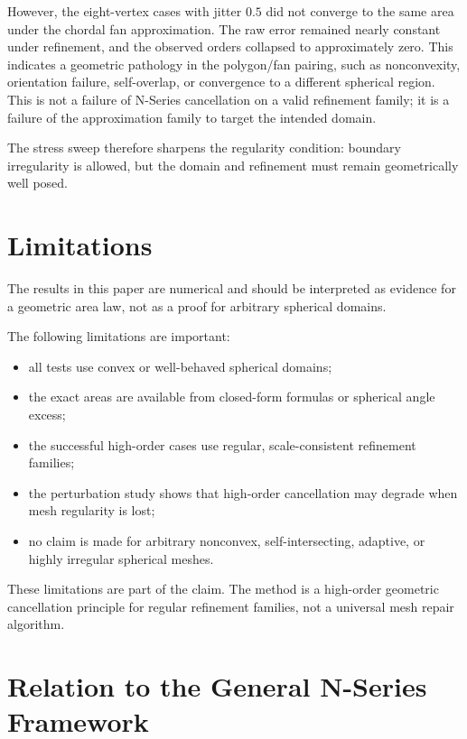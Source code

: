 \documentclass[11pt]{article}
\begin{document}
However, the eight-vertex cases with jitter $0.5$ did not converge to the
same area under the chordal fan approximation.  The raw error remained nearly
constant under refinement, and the observed orders collapsed to approximately
zero.  This indicates a geometric pathology in the polygon/fan pairing, such
as nonconvexity, orientation failure, self-overlap, or convergence to a
different spherical region.  This is not a failure of N-Series cancellation
on a valid refinement family; it is a failure of the approximation family to
target the intended domain.

The stress sweep therefore sharpens the regularity condition: boundary
irregularity is allowed, but the domain and refinement must remain
geometrically well posed.

\section{Limitations}

The results in this paper are numerical and should be interpreted as
evidence for a geometric area law, not as a proof for arbitrary spherical
domains.

The following limitations are important:

\begin{itemize}
\item all tests use convex or well-behaved spherical domains;
\item the exact areas are available from closed-form formulas or spherical
      angle excess;
\item the successful high-order cases use regular, scale-consistent
      refinement families;
\item the perturbation study shows that high-order cancellation may degrade
      when mesh regularity is lost;
\item no claim is made for arbitrary nonconvex, self-intersecting, adaptive,
      or highly irregular spherical meshes.
\end{itemize}

These limitations are part of the claim.  The method is a high-order
geometric cancellation principle for regular refinement families, not a
universal mesh repair algorithm.

\section{Relation to the General N-Series Framework}
\end{document}
